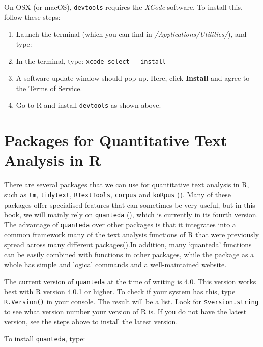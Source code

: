 \documentclass[
]{book}
\providecommand{\tightlist}{%
  \setlength{\itemsep}{0pt}\setlength{\parskip}{0pt}}
\begin{document}
On OSX (or macOS), \texttt{devtools} requires the \emph{XCode} software. To install this, follow these steps:

\begin{enumerate}
\def\labelenumi{\arabic{enumi}.}
\tightlist
\item
  Launch the terminal (which you can find in \emph{/Applications/Utilities/}), and type:
\item
  In the terminal, type: \texttt{xcode-select\ -\/-install}
\item
  A software update window should pop up. Here, click \textbf{Install} and agree to the Terms of Service.
\item
  Go to R and install \texttt{devtools} as shown above.
\end{enumerate}

\section{Packages for Quantitative Text Analysis in R}\label{packages-for-quantitative-text-analysis-in-r}

There are several packages that we can use for quantitative text analysis in R, such as \texttt{tm}, \texttt{tidytext}, \texttt{RTextTools}, \texttt{corpus} and \texttt{koRpus} (). Many of these packages offer specialised features that can sometimes be very useful, but in this book, we will mainly rely on \texttt{quanteda} (), which is currently in its fourth version. The advantage of \texttt{quanteda} over other packages is that it integrates into a common framework many of the text analysis functions of R that were previously spread across many different packages().In addition, many `quanteda' functions can be easily combined with functions in other packages, while the package as a whole has simple and logical commands and a well-maintained \href{www.quanteda.io}{website}.

The current version of \texttt{quanteda} at the time of writing is 4.0. This version works best with R version 4.0.1 or higher. To check if your system has this, type \texttt{R.Version()} in your console. The result will be a list. Look for \texttt{\$version.string} to see what version number your version of R is. If you do not have the latest version, see the steps above to install the latest version.

To install \texttt{quanteda}, type:
\end{document}
